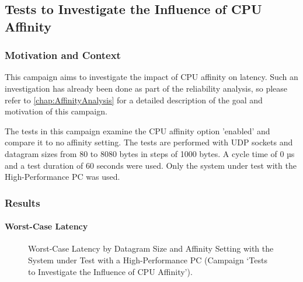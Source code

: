 \subsection{Tests to Investigate the Influence of CPU Affinity}
\subsubsection{Motivation and Context}
This campaign aims to investigate the impact of CPU affinity on latency. Such an investigation has already been done as part of the reliability analysis, so please refer to \ref{chap:AffinityAnalysis} for a detailed description of the goal and motivation of this campaign.

The tests in this campaign examine the CPU affinity option 'enabled' and compare it to no affinity setting. The tests are performed with UDP sockets and datagram sizes from 80 to 8080 bytes in steps of 1000 bytes. A cycle time of 0 µs and a test duration of 60 seconds were used. Only the system under test with the High-Performance PC was used.

\subsubsection{Results}
\paragraph{Worst-Case Latency}

\begin{figure}[h!]
  \centering
  \caption{Worst-Case Latency by Datagram Size and Affinity Setting with the System under Test with a High-Performance PC (Campaign `Tests to Investigate the Influence of CPU Affinity').}
  \label{fig:AffWc}
\end{figure}

